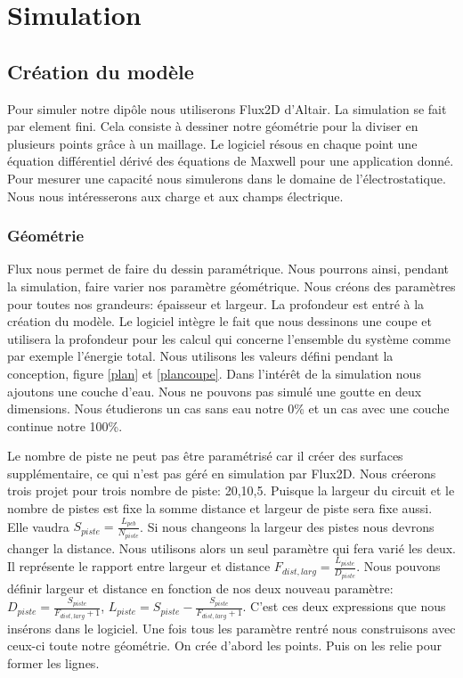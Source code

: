 \graphicspath{ {./figuresSimulation} }
\section{Simulation}
\subsection{Création du modèle}
Pour simuler notre dipôle nous utiliserons Flux2D d'Altair. La simulation se fait par element fini. Cela consiste à dessiner notre géométrie pour la diviser en plusieurs points grâce à un maillage. Le logiciel résous en chaque point une équation différentiel dérivé des équations de Maxwell pour une application donné. Pour mesurer une capacité nous simulerons dans le domaine de l'électrostatique. Nous nous intéresserons aux charge et aux champs électrique.

\subsubsection{Géométrie}
Flux nous permet de faire du dessin paramétrique. Nous pourrons ainsi, pendant la simulation, faire varier nos paramètre géométrique. Nous créons des paramètres pour toutes nos grandeurs: épaisseur et largeur. La profondeur est entré à la création du modèle. Le logiciel intègre le fait que nous dessinons une coupe et utilisera la profondeur  pour les calcul qui concerne l'ensemble du système comme par exemple l'énergie total. Nous utilisons les valeurs défini pendant la conception, figure \ref{plan} et \ref{plancoupe}. Dans l’intérêt de la simulation nous ajoutons une couche d'eau. Nous ne pouvons pas simulé une goutte en deux dimensions. Nous étudierons un cas sans eau notre 0\% et un cas avec une couche continue notre 100\%. 

Le nombre de piste ne peut pas être paramétrisé car il créer des surfaces supplémentaire, ce qui n'est pas géré en simulation par Flux2D. Nous créerons trois projet pour trois nombre de piste: 20,10,5. Puisque la largeur du circuit et le nombre de pistes est fixe la somme distance et largeur de piste sera fixe aussi. Elle vaudra $S_{piste} = \frac{L_{pcb}}{N_{piste}}$. Si nous changeons la largeur des pistes nous devrons changer la distance. Nous utilisons alors un seul paramètre qui fera varié les deux. Il représente le rapport entre largeur et distance $F_{dist,larg} = \frac{L_{piste}}{D_{piste}} $. Nous pouvons définir largeur et distance en fonction de nos deux nouveau paramètre: $D_{piste} = \frac{S_{piste}}{F_{dist,larg}+1}$, $L_{piste} = S_{piste} - \frac{S_{piste}}{F_{dist,larg}+1}$. C'est ces deux expressions que nous insérons dans le logiciel. 
Une fois tous les paramètre rentré nous construisons avec ceux-ci toute notre géométrie. On crée d'abord les points. Puis on les relie pour former les lignes.  

